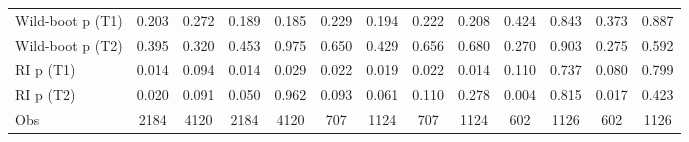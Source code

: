 {\begin{tabular}{l*{12}{c}}
Wild-boot p (T1)    &       0.203         &       0.272         &       0.189         &       0.185         &       0.229         &       0.194         &       0.222         &       0.208         &       0.424         &       0.843         &       0.373         &       0.887         \\
Wild-boot p (T2)    &       0.395         &       0.320         &       0.453         &       0.975         &       0.650         &       0.429         &       0.656         &       0.680         &       0.270         &       0.903         &       0.275         &       0.592         \\
RI p (T1)           &       0.014         &       0.094         &       0.014         &       0.029         &       0.022         &       0.019         &       0.022         &       0.014         &       0.110         &       0.737         &       0.080         &       0.799         \\
RI p (T2)           &       0.020         &       0.091         &       0.050         &       0.962         &       0.093         &       0.061         &       0.110         &       0.278         &       0.004         &       0.815         &       0.017         &       0.423         \\
Obs                 &        2184         &        4120         &        2184         &        4120         &         707         &        1124         &         707         &        1124         &         602         &        1126         &         602         &        1126         \\
\bottomrule
\end{tabular}
}
